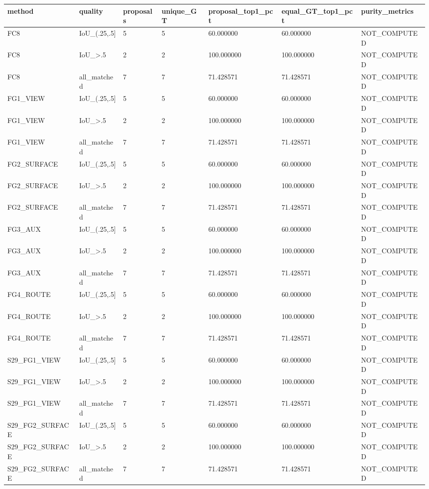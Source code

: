 \begin{tabular}{lllllll}
\toprule
method & quality & proposals & unique\_GT & proposal\_top1\_pct & equal\_GT\_top1\_pct & purity\_metrics \\
\midrule
FC8 & IoU\_(.25,.5] & 5 & 5 & 60.000000 & 60.000000 & NOT\_COMPUTED \\
FC8 & IoU\_>.5 & 2 & 2 & 100.000000 & 100.000000 & NOT\_COMPUTED \\
FC8 & all\_matched & 7 & 7 & 71.428571 & 71.428571 & NOT\_COMPUTED \\
FG1\_VIEW & IoU\_(.25,.5] & 5 & 5 & 60.000000 & 60.000000 & NOT\_COMPUTED \\
FG1\_VIEW & IoU\_>.5 & 2 & 2 & 100.000000 & 100.000000 & NOT\_COMPUTED \\
FG1\_VIEW & all\_matched & 7 & 7 & 71.428571 & 71.428571 & NOT\_COMPUTED \\
FG2\_SURFACE & IoU\_(.25,.5] & 5 & 5 & 60.000000 & 60.000000 & NOT\_COMPUTED \\
FG2\_SURFACE & IoU\_>.5 & 2 & 2 & 100.000000 & 100.000000 & NOT\_COMPUTED \\
FG2\_SURFACE & all\_matched & 7 & 7 & 71.428571 & 71.428571 & NOT\_COMPUTED \\
FG3\_AUX & IoU\_(.25,.5] & 5 & 5 & 60.000000 & 60.000000 & NOT\_COMPUTED \\
FG3\_AUX & IoU\_>.5 & 2 & 2 & 100.000000 & 100.000000 & NOT\_COMPUTED \\
FG3\_AUX & all\_matched & 7 & 7 & 71.428571 & 71.428571 & NOT\_COMPUTED \\
FG4\_ROUTE & IoU\_(.25,.5] & 5 & 5 & 60.000000 & 60.000000 & NOT\_COMPUTED \\
FG4\_ROUTE & IoU\_>.5 & 2 & 2 & 100.000000 & 100.000000 & NOT\_COMPUTED \\
FG4\_ROUTE & all\_matched & 7 & 7 & 71.428571 & 71.428571 & NOT\_COMPUTED \\
S29\_FG1\_VIEW & IoU\_(.25,.5] & 5 & 5 & 60.000000 & 60.000000 & NOT\_COMPUTED \\
S29\_FG1\_VIEW & IoU\_>.5 & 2 & 2 & 100.000000 & 100.000000 & NOT\_COMPUTED \\
S29\_FG1\_VIEW & all\_matched & 7 & 7 & 71.428571 & 71.428571 & NOT\_COMPUTED \\
S29\_FG2\_SURFACE & IoU\_(.25,.5] & 5 & 5 & 60.000000 & 60.000000 & NOT\_COMPUTED \\
S29\_FG2\_SURFACE & IoU\_>.5 & 2 & 2 & 100.000000 & 100.000000 & NOT\_COMPUTED \\
S29\_FG2\_SURFACE & all\_matched & 7 & 7 & 71.428571 & 71.428571 & NOT\_COMPUTED \\

\end{tabular}
